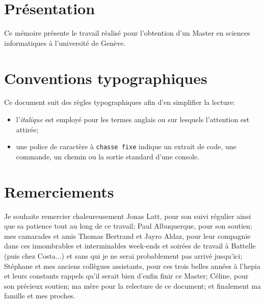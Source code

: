 \section*{Présentation}
Ce mémoire présente le travail réalisé pour l'obtention d'un Master en sciences informatiques à l'université de Genève.


\section*{Conventions typographiques}\label{title-avantpropos}

\noindent Ce document suit des règles typographiques afin d'en simplifier la lecture:

\begin{itemize}
\item l'\textit{italique} est employé pour les termes anglais ou sur lesquels l'attention est attirée;
\item une police de caractère à \texttt{chasse fixe} indique un extrait de code, une commande, un chemin ou la sortie standard d'une console.
\end{itemize}

\section*{Remerciements}
Je souhaite remercier chaleureusement Jonas Latt, pour son suivi régulier ainsi que sa patience tout au long de ce travail; Paul Albuquerque, pour son soutien; mes camarades et amis Thomas Bertrand et Jayro Aldaz, pour leur compagnie dans ces innombrables et interminables week-ends et soirées de travail à Battelle (puis chez Costa...) et sans qui je ne serai probablement pas arrivé jusqu'ici; Stéphane et mes anciens collègues assistants, pour ces trois belles années à l'hepia et leurs constants rappels qu'il serait bien d'enfin finir ce Master; Céline, pour son précieux soutien; ma mère pour la relecture de ce document; et finalement ma famille et mes proches.

